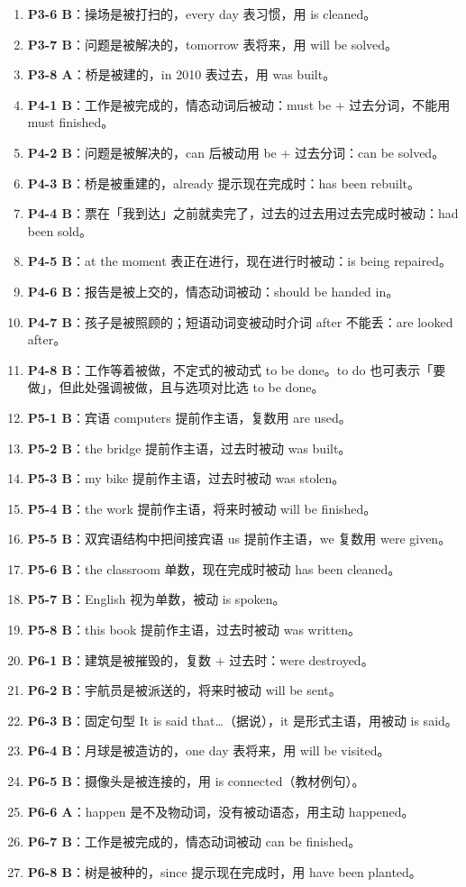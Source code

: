 \documentclass[11pt,a4paper]{ctexart}
\begin{document}
\begin{enumerate}[leftmargin=1.6em,itemsep=2pt]
\item \textbf{P3-6 B}：操场是被打扫的，every day 表习惯，用 is cleaned。
\item \textbf{P3-7 B}：问题是被解决的，tomorrow 表将来，用 will be solved。
\item \textbf{P3-8 A}：桥是被建的，in 2010 表过去，用 was built。
\item \textbf{P4-1 B}：工作是被完成的，情态动词后被动：must be + 过去分词，不能用 must finished。
\item \textbf{P4-2 B}：问题是被解决的，can 后被动用 be + 过去分词：can be solved。
\item \textbf{P4-3 B}：桥是被重建的，already 提示现在完成时：has been rebuilt。
\item \textbf{P4-4 B}：票在「我到达」之前就卖完了，过去的过去用过去完成时被动：had been sold。
\item \textbf{P4-5 B}：at the moment 表正在进行，现在进行时被动：is being repaired。
\item \textbf{P4-6 B}：报告是被上交的，情态动词被动：should be handed in。
\item \textbf{P4-7 B}：孩子是被照顾的；短语动词变被动时介词 after 不能丢：are looked after。
\item \textbf{P4-8 B}：工作等着被做，不定式的被动式 to be done。to do 也可表示「要做」，但此处强调被做，且与选项对比选 to be done。
\item \textbf{P5-1 B}：宾语 computers 提前作主语，复数用 are used。
\item \textbf{P5-2 B}：the bridge 提前作主语，过去时被动 was built。
\item \textbf{P5-3 B}：my bike 提前作主语，过去时被动 was stolen。
\item \textbf{P5-4 B}：the work 提前作主语，将来时被动 will be finished。
\item \textbf{P5-5 B}：双宾语结构中把间接宾语 us 提前作主语，we 复数用 were given。
\item \textbf{P5-6 B}：the classroom 单数，现在完成时被动 has been cleaned。
\item \textbf{P5-7 B}：English 视为单数，被动 is spoken。
\item \textbf{P5-8 B}：this book 提前作主语，过去时被动 was written。
\item \textbf{P6-1 B}：建筑是被摧毁的，复数 + 过去时：were destroyed。
\item \textbf{P6-2 B}：宇航员是被派送的，将来时被动 will be sent。
\item \textbf{P6-3 B}：固定句型 It is said that…（据说），it 是形式主语，用被动 is said。
\item \textbf{P6-4 B}：月球是被造访的，one day 表将来，用 will be visited。
\item \textbf{P6-5 B}：摄像头是被连接的，用 is connected（教材例句）。
\item \textbf{P6-6 A}：happen 是不及物动词，没有被动语态，用主动 happened。
\item \textbf{P6-7 B}：工作是被完成的，情态动词被动 can be finished。
\item \textbf{P6-8 B}：树是被种的，since 提示现在完成时，用 have been planted。
\end{enumerate}
\end{document}
